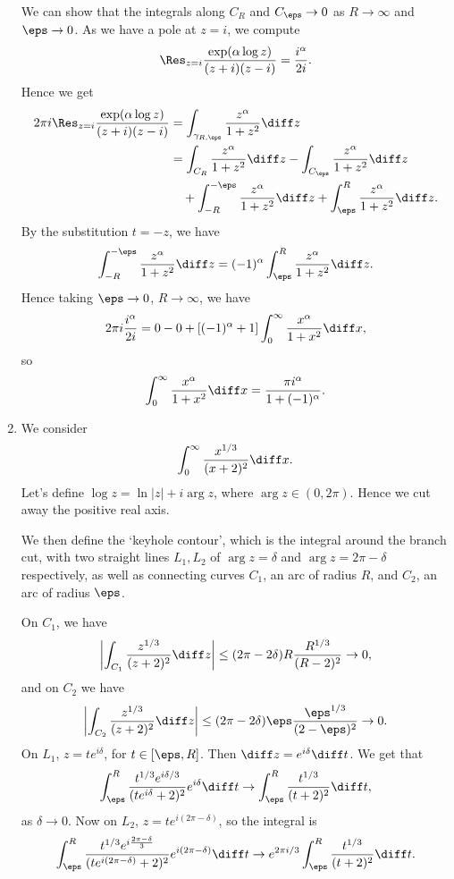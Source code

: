 \documentclass[12pt]{article}
\begin{document}
\begin{exbox}
\begin{enumerate}
		We can show that the integrals along $C_R$ and $C_\eps \to 0$ as $R \to \infty$ and $\eps \to 0$. As we have a pole at $z = i$, we compute
		\[
			\Res_{z=i} \frac{\exp(\alpha \log z)}{(z+i)(z-i)} = \frac{i^{\alpha}}{2 i}.
		\]
		Hence we get
		\begin{align*}
			2 \pi i \Res_{z = i}\frac{\exp(\alpha \log z)}{(z+i)(z-i)} &= \int_{\gamma_{R,\eps}}\frac{z^{\alpha}}{1 + z^2} \diff z \\
										   &= \int_{C_R} \frac{z^\alpha}{1 + z^2} \diff z - \int_{C_\eps} \frac{z^{\alpha}}{1 + z^2} \diff z \\
										   &\quad + \int_{-R}^{-\eps} \frac{z^{\alpha}}{1+z^2}\diff z + \int_\eps^R \frac{z^{\alpha}}{1+z^2}\diff z.
		\end{align*}
		By the substitution $t = -z$, we have
		\[
		\int_{-R}^{-\eps} \frac{z^{\alpha}}{1+z^2}\diff z = (-1)^{\alpha} \int_\eps^R \frac{z^{\alpha}}{1+z^2}\diff z.
		\]
		Hence taking $\eps \to 0$, $R \to \infty$, we have
		\[
			2\pi i\frac{i^{\alpha}}{2 i} = 0 - 0 + [(-1)^{\alpha} + 1] \int_0^{\infty} \frac{x^{\alpha}}{1 + x^2} \diff x,
		\]
		so
		\[
		\int_0^{\infty} \frac{x^{\alpha}}{1 + x^2} \diff x = \frac{\pi i^{\alpha}}{1 + (-1)^{\alpha}}.
		\]
	\item We consider
		\[
		\int_0^\infty \frac{x^{1/3}}{(x+2)^2}\diff x.
		\]
		Let's define $\log z = \ln|z| + i \arg z$, where $\arg z \in (0, 2\pi)$. Hence we cut away the positive real axis.

		We then define the `keyhole contour', which is the integral around the branch cut, with two straight lines $L_1, L_2$ of $\arg z = \delta$ and $\arg z = 2\pi - \delta$ respectively, as well as connecting curves $C_1$, an arc of radius $R$, and $C_2$, an arc of radius $\eps$.

		On $C_1$, we have
		\[
		\biggl| \int_{C_1} \frac{z^{1/3}}{(z+2)^2} \diff z \biggr| \le (2\pi - 2\delta)R \frac{R^{1/3}}{(R-2)^2} \to 0,
		\]
		and on $C_2$ we have
		\[
		\biggl| \int_{C_2} \frac{z^{1/3}}{(z+2)^2}\diff z \biggr| \le (2\pi - 2\delta)\eps \frac{\eps^{1/3}}{(2-\eps)^2} \to 0.
		\]
		On $L_1$, $z = te^{i\delta}$, for $t \in [\eps, R]$. Then $\diff z = e^{i\delta} \diff t$. We get that
		\[
		\int_\eps^R \frac{t^{1/3}e^{i\delta/3}}{(te^{i\delta}+2)^2}e^{i\delta}\diff t \to \int_\eps^R \frac{t^{1/3}}{(t+2)^2}\diff t,
		\]
		as $\delta \to 0$. Now on $L_2$, $z = te^{i(2\pi - \delta)}$, so the integral is
		\[
		\int_\eps^R \frac{t^{1/3}e^{i \frac{2\pi - \delta}{3}}}{(t e^{i(2\pi - \delta)} + 2)^2} e^{i(2\pi - \delta)}\diff t \to e^{2 \pi i/3} \int_\eps^R \frac{t^{1/3}}{(t+2)^2}\diff t.
		\]


\end{enumerate}
\end{exbox}
\end{document}
